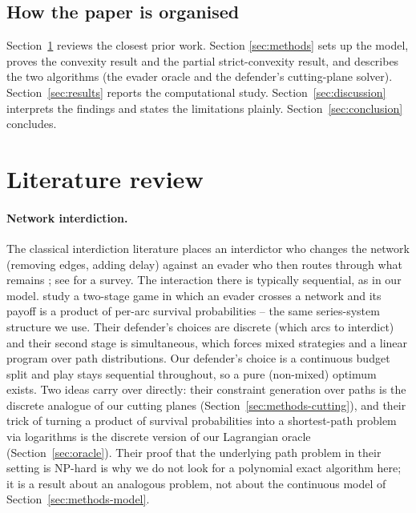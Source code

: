 \documentclass[11pt,a4paper]{article}
\theoremstyle{plain}
\theoremstyle{definition}
\begin{document}
\subsection{How the paper is organised}
Section~\ref{sec:litreview} reviews the closest prior work. Section
\ref{sec:methods} sets up the model, proves the convexity result and the
partial strict-convexity result, and describes the two algorithms (the
evader oracle and the defender's cutting-plane solver). Section~\ref{sec:results} reports the
computational study. Section~\ref{sec:discussion} interprets the findings
and states the limitations plainly. Section~\ref{sec:conclusion}
concludes.

\section{Literature review}
\label{sec:litreview}

\paragraph{Network interdiction.}
The classical interdiction literature places an interdictor who changes
the network (removing edges, adding delay) against an evader who then
routes through what remains \citep{washburn1995,israeli2002}; see
\citet{smith2020} for a survey. The interaction there is typically
sequential, as in our model. \citet{nguyen2023} study a two-stage game in
which an evader crosses a network and its payoff is a product of per-arc
survival probabilities -- the same series-system structure we use. Their
defender's choices are discrete (which arcs to interdict) and their
second stage is simultaneous, which forces mixed strategies and a linear
program over path distributions. Our defender's choice is a continuous
budget split and play stays sequential throughout, so a pure (non-mixed)
optimum exists. Two ideas carry over directly: their constraint generation
over paths is the discrete analogue of our cutting planes
(Section~\ref{sec:methods-cutting}), and their trick of turning a product
of survival probabilities into a shortest-path problem via logarithms is
the discrete version of our Lagrangian oracle
(Section~\ref{sec:oracle}). Their proof that the underlying path problem in their setting
is NP-hard is why we do not look for a polynomial exact algorithm here; it
is a result about an analogous problem, not about the continuous model of
Section~\ref{sec:methods-model}.
\end{document}
